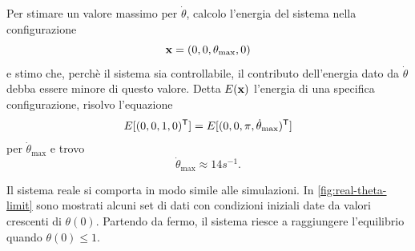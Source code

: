 Per stimare un valore massimo per $\dot \theta$, calcolo l'energia del
sistema nella configurazione
\begin{equation*}
    \mathbf{x} = (0, 0, \theta_{\max}, 0)
\end{equation*}
e stimo che, perchè il sistema sia controllabile,
il contributo dell'energia dato da $\dot \theta$ debba essere
minore di questo valore.
Detta $E(\mathbf{x})$ l'energia di una specifica configurazione, risolvo l'equazione
\begin{equation*}
    E[(0, 0, 1, 0)^{\mathsf{T}}] = E[(0, 0, \pi, \dot \theta_{\max})^{\mathsf{T}}]
\end{equation*}
per $\dot \theta_{\max}$ e trovo
\begin{equation*}
    \dot \theta_{\max} \approx 14 s^{-1}.
\end{equation*}

Il sistema reale si comporta in modo simile alle simulazioni.
In \autoref{fig:real-theta-limit} sono mostrati alcuni set di dati
con condizioni iniziali date da valori crescenti di $\theta(0)$.
Partendo da fermo, il sistema riesce a raggiungere l'equilibrio quando
$\theta(0) \leq 1$. 

